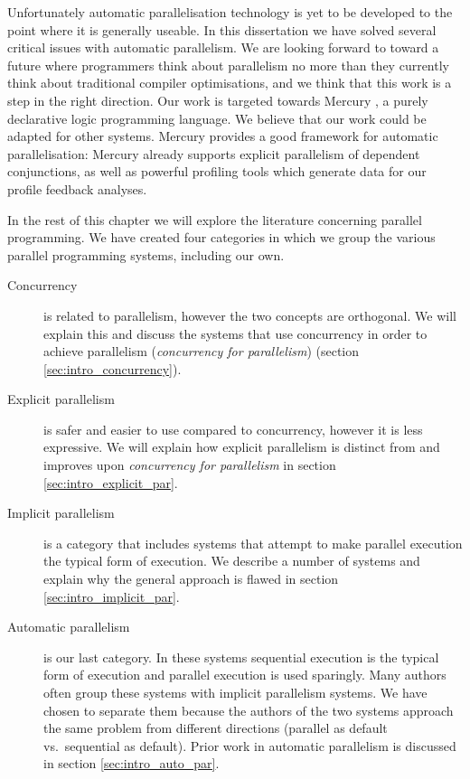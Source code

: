 Unfortunately automatic parallelisation technology is yet to be developed to the
point where it is generally useable.
In this dissertation we have solved several critical issues with automatic
parallelism.
We are looking forward to toward a future where programmers think about
parallelism no more than they currently think about traditional compiler
optimisations,
and we think that this work is a step in the right direction.
Our work is targeted towards Mercury \citep{mercury_jlp},
a purely declarative logic programming language.
We believe that our work could be adapted for other systems.
Mercury provides a good framework for automatic parallelisation:
Mercury already supports explicit parallelism of dependent conjunctions,
as well as powerful profiling tools which generate data for our profile
feedback analyses.

In the rest of this chapter we will explore the literature concerning
parallel programming.
We have created four categories in which we group the various parallel
programming systems, including our own.

\begin{description}
    \item[Concurrency] is related to parallelism, however the two concepts
    are orthogonal.
    We will explain this and discuss the systems that use concurrency in
    order to achieve parallelism (\emph{concurrency for parallelism})
    (section \ref{sec:intro_concurrency}).

    \item[Explicit parallelism] is safer and easier to use compared to
    concurrency, however it is less expressive.
    We will explain how explicit parallelism is distinct from and improves
    upon \emph{concurrency for parallelism} in section
    \ref{sec:intro_explicit_par}.

    \item[Implicit parallelism] is a category that includes 
    systems that attempt to make parallel execution the typical form of
    execution.
    We describe a number of systems and explain why the general approach is
    flawed in section \ref{sec:intro_implicit_par}.

    \item[Automatic parallelism] is our last category.
    In these systems sequential execution is the typical form of execution
    and parallel execution is used sparingly.
    Many authors often group these systems with implicit parallelism systems.
    We have chosen to separate them because the authors of the two systems
    approach the same problem from different directions
    (parallel as default vs.\ sequential as default).
    Prior work in automatic parallelism is discussed in section
    \ref{sec:intro_auto_par}.
\end{description}    

